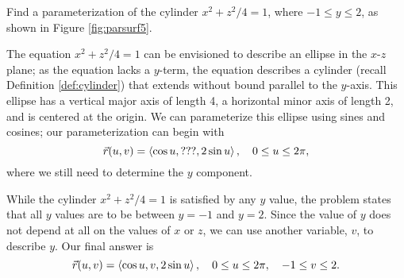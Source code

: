 {Find a parameterization of the cylinder $x^2 + z^2/4=1$, where $-1\leq y\leq 2$, as shown in Figure \ref{fig:parsurf5}. 
}
{The equation $x^2+z^2/4=1$ can be envisioned to describe an ellipse in the $x$-$z$ plane; as the equation lacks a $y$-term, the equation describes a cylinder (recall Definition \ref{def:cylinder}) that extends without bound parallel to the $y$-axis. This ellipse has a vertical major axis of length 4, a horizontal minor axis of length 2, and is centered at the origin. We can parameterize this ellipse using sines and cosines; our parameterization can begin with
$$\vec r(u,v) = \left\langle \cos u, \text{???}, 2\sin u\right\rangle,\quad 0\leq u\leq 2\pi,$$
where we still need to determine the $y$ component.


While the cylinder $x^2+z^2/4=1$ is satisfied by any $y$ value, the problem states that all $y$ values are to be between $y=-1$ and $y=2$. Since the value of $y$ does not depend at all on the values of $x$ or $z$, we can use another variable, $v$, to describe $y$. Our final answer is
$$\vec r(u,v) = \left\langle \cos u, v, 2\sin u\right\rangle, \quad 0\leq u\leq 2\pi,\quad -1\leq v\leq 2.$$
\baselineskip
}\\

